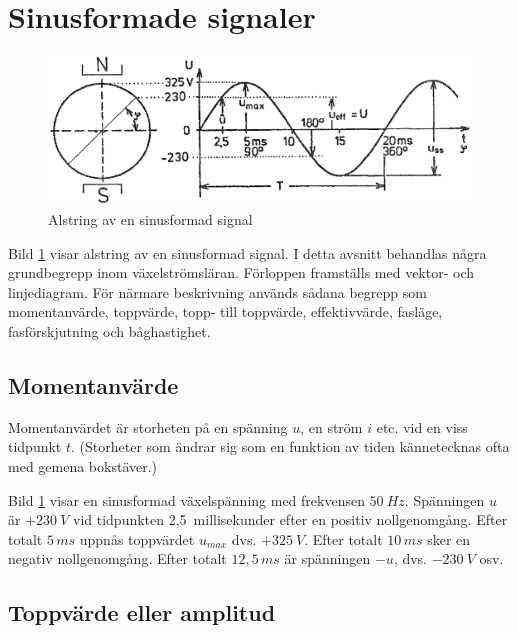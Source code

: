 \section{Sinusformade signaler}

\begin{figure}[ht]
\includegraphics[width=\textwidth]{images/cropped_pdfs/bild_2_1-16.pdf}
\caption{Alstring av en sinusformad signal}
\label{fig:BildII1-16}
\end{figure}

Bild \ref{fig:BildII1-16} visar alstring av en sinusformad signal.
I detta avsnitt behandlas några grundbegrepp inom växelströmsläran.
Förloppen framställs med vektor- och linjediagram.
För närmare beskrivning används sådana begrepp som momentanvärde,
toppvärde, topp- till toppvärde, effektivvärde, fasläge, fasförskjutning och
båghastighet.

\subsection{Momentanvärde}

Momentanvärdet är storheten på en spänning \(u\), en ström \(i\) etc. vid en
viss tidpunkt \(t\).
(Storheter som ändrar sig som en funktion av tiden kännetecknas ofta med gemena
bokstäver.)

Bild \ref{fig:BildII1-16} visar en sinusformad växelspänning med frekvensen
\(50\ Hz\).
Spänningen \(u\) är \(+230\ V\) vid tidpunkten 2,5~millisekunder efter en
positiv nollgenomgång.
Efter totalt \(5\, ms\) uppnås toppvärdet \(u_{max}\) dvs. \(+325\ V\).
Efter totalt \(10\, ms\) sker en negativ nollgenomgång.
Efter totalt \(12,5\, ms\) är spänningen \(-u\), dvs. \(-230\ V\) osv.

\subsection{Toppvärde eller amplitud}

